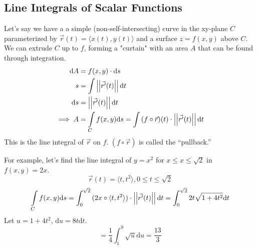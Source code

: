 \subsection{Line Integrals of Scalar Functions}
\noindent
Let's say we have a a simple (non-self-intersecting) curve in the xy-plane $C$ parameterized by $\vec{r}(t) = \langle x(t), y(t)\rangle$ and a surface $z = f(x,y)$ above $C$. We can extrude $C$ up to $f$, forming a "curtain" with an area $A$ that can be found through integration.
\begin{align*}
	\mathrm{d}A &= f(x,y) \cdot \mathrm{d}s	\\
	s &= \int{\left|\left|\vec{r^\prime}(t)\right|\right|\mathrm{d}t} \\
	\mathrm{d}s &= \left|\left|\vec{r'}(t)\right|\right|\mathrm{d}t \\
	\implies A &= \int\limits_{C}{f(x,y)\mathrm{d}s} = \int{(f\circ\vec{r})(t) \cdot \left|\left|\vec{r^\prime}(t)\right|\right|\mathrm{d}t}
\end{align*}
This is the line integral of $\vec{r}$ on $f$. $(f\circ\vec{r})$ is called the ``pullback.''

\noindent
For example, let's find the line integral of $y = x^2$ for $x \leq x \leq \sqrt{2}$ in $f(x,y) = 2x$.
\begin{equation*}
	\vec{r}(t) = \langle t, t^2 \rangle, 0 \leq t \leq \sqrt{2}	
\end{equation*}
\begin{equation*}
	\int\limits_{C}{f(x,y)\mathrm{d}s} = \int_{0}^{\sqrt{2}}{(2x \circ \langle t, t^2\rangle) \cdot \left|\left|\vec{r^\prime}(t)\right|\right|\mathrm{d}t} = \int_{0}^{\sqrt{2}}{2t\sqrt{1 + 4t^2}\mathrm{d}t}
\end{equation*}
Let $u = 1+4t^2$, $\mathrm{d}u = 8t\mathrm{d}t$.
\begin{equation*}
	= \frac{1}{4}\int_{1}^{9}{\sqrt{u}\mathrm{d}u} = \frac{13}{3}
\end{equation*}
